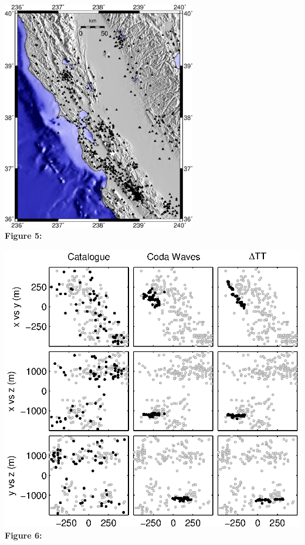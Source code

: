 \documentclass[12pt,double]{article}
\begin{document}
\clearpage
\noindent\includegraphics[width=20pc]{Figure5.eps} \\
\textbf{Figure 5:} 

\clearpage
\includegraphics{Figure6_bw.eps} \\
\textbf{Figure 6:} 
\end{document}

